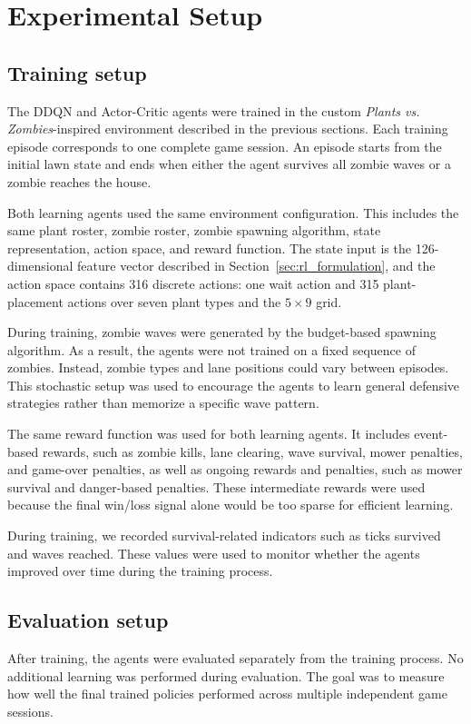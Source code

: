 \documentclass[conference,onecolumn]{IEEEtran}
\begin{document}
\section{Experimental Setup}
\label{sec:evaluation}
\subsection{Training setup}
The DDQN and Actor-Critic agents were trained in the custom \textit{Plants vs. Zombies}-inspired environment described in the previous sections. Each training episode corresponds to one complete game session. An episode starts from the initial lawn state and ends when either the agent survives all zombie waves or a zombie reaches the house.

Both learning agents used the same environment configuration. This includes the same plant roster, zombie roster, zombie spawning algorithm, state representation, action space, and reward function. The state input is the 126-dimensional feature vector described in Section~\ref{sec:rl_formulation}, and the action space contains 316 discrete actions: one wait action and 315 plant-placement actions over seven plant types and the $5 \times 9$ grid.

During training, zombie waves were generated by the budget-based spawning algorithm. As a result, the agents were not trained on a fixed sequence of zombies. Instead, zombie types and lane positions could vary between episodes. This stochastic setup was used to encourage the agents to learn general defensive strategies rather than memorize a specific wave pattern.

The same reward function was used for both learning agents. It includes event-based rewards, such as zombie kills, lane clearing, wave survival, mower penalties, and game-over penalties, as well as ongoing rewards and penalties, such as mower survival and danger-based penalties. These intermediate rewards were used because the final win/loss signal alone would be too sparse for efficient learning.

During training, we recorded survival-related indicators such as ticks survived and waves reached. These values were used to monitor whether the agents improved over time during the training process.

\subsection{Evaluation setup}
After training, the agents were evaluated separately from the training process. No additional learning was performed during evaluation. The goal was to measure how well the final trained policies performed across multiple independent game sessions.
\end{document}
